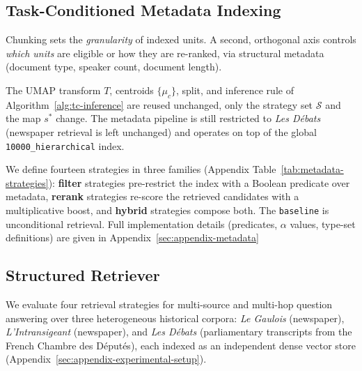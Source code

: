 \subsection{Task-Conditioned Metadata Indexing}
\label{sec:metadata-methodology}

Chunking sets the \emph{granularity} of indexed units. A second, orthogonal
axis controls \emph{which units} are eligible or how they are re-ranked,
via structural metadata (document type, speaker count, document length).

The UMAP transform $T$, centroids $\{\mu_c\}$, split, and inference rule of Algorithm~\ref{alg:tc-inference} are reused unchanged, only the strategy set $\mathcal{S}$ and the map $s^{*}$ change. The metadata pipeline is still restricted to \textit{Les Débats} (newspaper retrieval is left unchanged) and operates on top of the global \texttt{10000\_hierarchical} index.

We define fourteen strategies in three families (Appendix Table~\ref{tab:metadata-strategies}): \textbf{filter} strategies
pre-restrict the index with a Boolean predicate over metadata,
\textbf{rerank} strategies re-score the retrieved candidates with a
multiplicative boost, and \textbf{hybrid} strategies compose both. The
\texttt{baseline} is unconditional retrieval. Full implementation details (predicates, $\alpha$ values, type-set definitions) are given in Appendix~\ref{sec:appendix-metadata}


\subsection{Structured Retriever}
\label{sec:two-phase}


We evaluate four retrieval strategies for multi-source and multi-hop question answering
over three heterogeneous historical corpora: \textit{Le Gaulois} (newspaper),
\textit{L'Intransigeant} (newspaper), and \textit{Les Débats} (parliamentary
transcripts from the French Chambre des Députés), each indexed as an independent
dense vector store (Appendix~\ref{sec:appendix-experimental-setup}).

